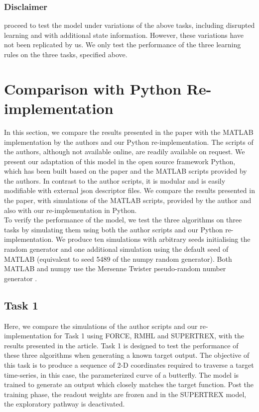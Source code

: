 \subsubsection{Disclaimer}
\textcite{pyle2019} proceed to test the model under variations of the above tasks, including disrupted learning and with additional state information. However, these variations have not been replicated by us. We only test the performance of the three learning rules on the three tasks, specified above.


\section{Comparison with Python Re-implementation}

In this section, we compare the results presented in the paper \cite{pyle2019} with the MATLAB implementation by the authors and our Python re-implementation. The scripts of the authors, although not available online, are readily available on request. We present our adaptation of this model in the open source framework Python, which has been built based on the paper and the MATLAB scripts provided by the authors. In contrast to the author scripts, it is modular and is easily modifiable with external json descriptor files. We compare the results presented in the paper, with simulations of the MATLAB scripts, provided by the author and also with our re-implementation in Python.\\ 

To verify the performance of the model, we test the three algorithms on three tasks by simulating them using both the author scripts and our Python re-implementation. We produce ten simulations with arbitrary seeds initialising the random generator and one additional simulation using the default seed of MATLAB (equivalent to seed 5489 of the numpy random generator). Both MATLAB and numpy use the Mersenne Twister pseudo-random number generator \cite{matsumoto1998}.



\subsection{Task 1}

Here, we compare the simulations of the author scripts and our re-implementation for Task 1 using FORCE, RMHL and SUPERTREX, with the results presented in the article. Task 1 is designed to test the performance of these three algorithms when generating a known target output. The objective of this task is to produce a sequence of 2-D coordinates required to traverse a target time-series, in this case, the parameterized curve of a butterfly. The model is trained to generate an output which closely matches the target function. Post the training phase, the readout weights are frozen and in the SUPERTREX model, the exploratory pathway is deactivated. \\ 

